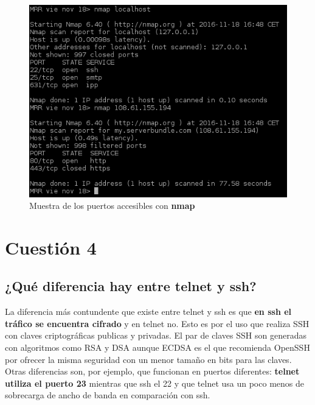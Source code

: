 \begin{figure}[H] %
	\centering
	\includegraphics[scale=0.9]{figuras/figura13.png} 
	\caption{Muestra de los puertos accesibles con \textbf{nmap}} 
	\label{fig:figura13}
\end{figure}

\newpage



\section{Cuestión 4}
\subsection{¿Qué diferencia hay entre telnet y ssh?}

La diferencia más contundente que existe entre telnet y ssh es que \textbf{en ssh el tráfico se encuentra cifrado} y en telnet no.
Esto es por el uso que realiza SSH con claves criptográficas publicas y privadas. El par de claves SSH son generadas con algoritmos como RSA y DSA aunque ECDSA es el que recomienda  OpenSSH por ofrecer la misma seguridad con un menor tamaño en bits para las claves. 
\\

Otras diferencias son, por ejemplo, que funcionan en puertos diferentes: \textbf{telnet utiliza el puerto 23} mientras que ssh el 22 y que telnet usa un poco menos de sobrecarga de ancho de banda en comparación con ssh.
 

